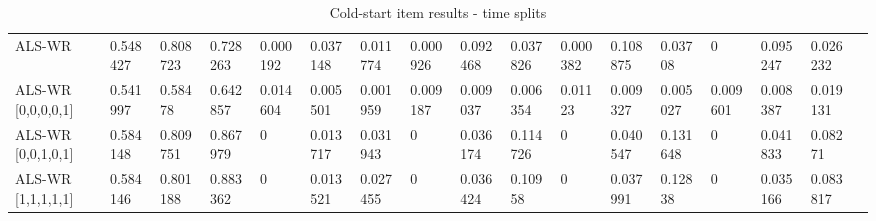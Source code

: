 \begin{table}[H]
{\begin{tabular}{*{17}{l}}
\rowcolor{Gray}
ALS-WR 			   & 0.548427&	0.808723&	0.728263&	0.000192&	0.037148&	0.011774&	0.000926&	0.092468&	0.037826&	0.000382&	0.108875&	0.03708	&	0	&	0.095247	&	0.026232	&	\\
ALS-WR [0,0,0,0,1] & 0.541997&	0.58478	&	0.642857&	0.014604&	0.005501&	0.001959&	0.009187&	0.009037&	0.006354&	0.01123	&	0.009327&	0.005027&	0.009601&	0.008387&	0.019131& \\
ALS-WR [0,0,1,0,1] & 0.584148&	0.809751&	0.867979&	0		&	0.013717&	0.031943&	0	&	0.036174&	0.114726&	0	&	0.040547&	0.131648&	0	&	0.041833&	0.08271	& \\
ALS-WR [1,1,1,1,1] & 0.584146&	0.801188&	0.883362&	0		&	0.013521&	0.027455&	0&	0.036424&	0.10958&	0&	0.037991&	0.12838	&	0	&	0.035166	&	0.083817	& \\

\bottomrule
\end{tabular}
}
\caption{Cold-start item results - time splits}
\end{table}

